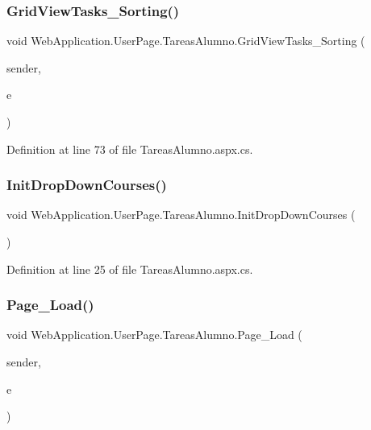 \subsubsection{\texorpdfstring{GridViewTasks\_Sorting()}{GridViewTasks\_Sorting()}}
{\footnotesize\ttfamily void Web\+Application.\+User\+Page.\+Tareas\+Alumno.\+Grid\+View\+Tasks\+\_\+\+Sorting (\begin{DoxyParamCaption}\item[{object}]{sender,  }\item[{Grid\+View\+Sort\+Event\+Args}]{e }\end{DoxyParamCaption})\hspace{0.3cm}{\ttfamily [protected]}}



Definition at line 73 of file Tareas\+Alumno.\+aspx.\+cs.

\mbox{\label{classWebApplication_1_1UserPage_1_1TareasAlumno_ab0cfef17218faaef8b7a36d84b04ab7f}} 
\subsubsection{\texorpdfstring{InitDropDownCourses()}{InitDropDownCourses()}}
{\footnotesize\ttfamily void Web\+Application.\+User\+Page.\+Tareas\+Alumno.\+Init\+Drop\+Down\+Courses (\begin{DoxyParamCaption}{ }\end{DoxyParamCaption})\hspace{0.3cm}{\ttfamily [private]}}



Definition at line 25 of file Tareas\+Alumno.\+aspx.\+cs.

\mbox{\label{classWebApplication_1_1UserPage_1_1TareasAlumno_a84541b38d186ebdbd9e5057e66f12360}} 
\subsubsection{\texorpdfstring{Page\_Load()}{Page\_Load()}}
{\footnotesize\ttfamily void Web\+Application.\+User\+Page.\+Tareas\+Alumno.\+Page\+\_\+\+Load (\begin{DoxyParamCaption}\item[{object}]{sender,  }\item[{Event\+Args}]{e }\end{DoxyParamCaption})\hspace{0.3cm}{\ttfamily [protected]}}



